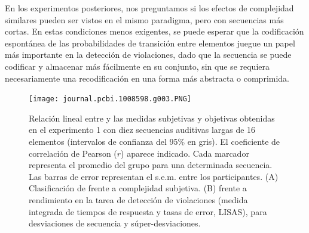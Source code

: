 En los experimentos posteriores, nos preguntamos si los efectos de complejidad similares pueden ser vistos en el mismo paradigma, pero con secuencias más cortas. En estas condiciones menos exigentes, se puede esperar que la codificación espontánea de las probabilidades de transición entre elementos juegue un papel más importante en la detección de violaciones, dado que la secuencia se puede codificar y almacenar más fácilmente en su conjunto, sin que se requiera necesariamente una recodificación en una forma más abstracta o comprimida.

\begin{figure}[t!]
   \texttt{[image: journal.pcbi.1008598.g003.PNG]}
   \centering
   \caption{Relación lineal entre \mdlbin y las medidas subjetivas y objetivas obtenidas en el experimento 1 con diez secuencias auditivas largas de 16 elementos (intervalos de confianza del 95\% en gris). El coeficiente de correlación de Pearson ($r$) aparece indicado. Cada marcador representa el promedio del grupo para una determinada secuencia. Las barras de error representan el s.e.m. entre los participantes. (A) Clasificación de \mdlbin frente a complejidad subjetiva. (B) \mdlbin frente a rendimiento en la tarea de detección de violaciones (medida integrada de tiempos de respuesta y tasas de error, LISAS), para desviaciones de secuencia y súper-desviaciones.}
   \label{PlosBIO-F3}
\end{figure}

